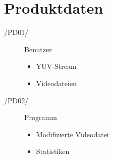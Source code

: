 \section{Produktdaten}

\begin{description}
  \item[/PD01/] Benutzer
    \begin{itemize}
      \item YUV-Stream
      \item Videodateien
    \end{itemize}
  \item[/PD02/] Programm
    \begin{itemize}
      \item Modifizierte Videodatei
      \item Statistiken
    \end{itemize}
\end{description}
